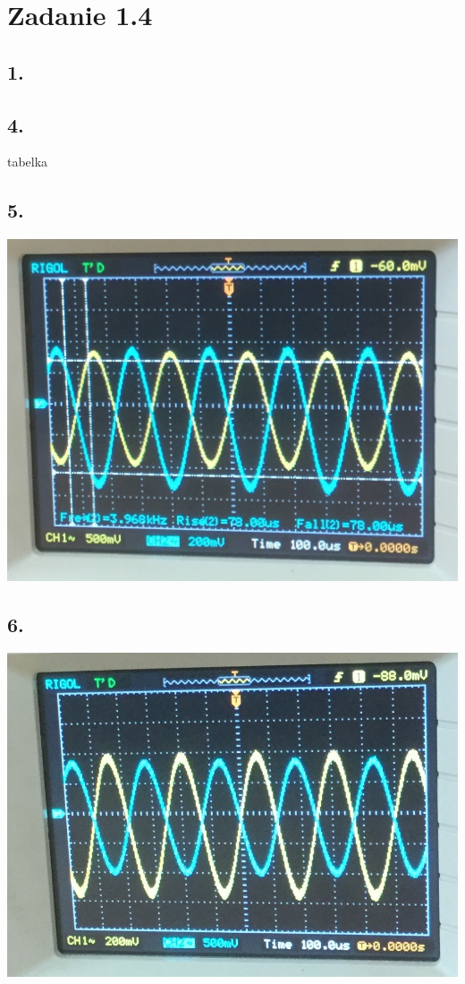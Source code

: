 \documentclass[polish,a4paper]{article}
\begin{document}
\section{Zadanie 1.4}

\subsection*{1.}

\subsection*{4.}
tabelka
\subsection*{5.}
\includegraphics[scale=0.5]{czestotliwosc}
\subsection*{6.}
\includegraphics[scale=0.5]{k_odwracajaca}
\end{document}
